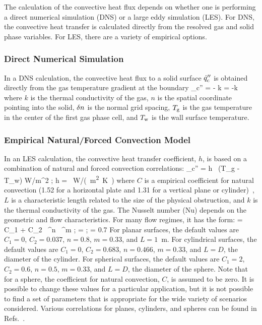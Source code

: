 The calculation of the convective heat flux depends on whether one is performing a direct numerical simulation (DNS) or a large eddy simulation (LES). For DNS, the convective heat transfer is calculated directly from the resolved gas and solid phase variables. For LES, there are a variety of empirical options.

\subsubsection{Direct Numerical Simulation}

In a DNS calculation, the convective heat flux to a solid surface $\dot{q}''_{\rm c}$ is obtained directly from the gas temperature gradient at the boundary
\be
   \dq_{\rm c}'' = - k \;  = -k 
\ee
where $k$ is the thermal conductivity of the gas, $n$ is the spatial coordinate pointing into the solid, $\delta n$ is the normal grid spacing, $T_{\rm g}$ is the gas temperature in the center of the first gas phase cell, and $T_{\rm w}$ is the wall surface temperature.

\subsubsection{Empirical Natural/Forced Convection Model}

In an LES calculation, the convective heat transfer coefficient, $h$, is based on a combination of natural and forced convection correlations:
\be \dq_{\rm c}'' = h \, (T_{\rm g} - T_{\rm w}) \quad \hbox{W/m}^2 \quad ; \quad h =
    \max \,   \quad  \si{W/(m^2.K)}
    \label{eq:qconv}
\ee
where $C$ is a empirical coefficient for natural convection (1.52 for a horizontal plate and 1.31 for a vertical plane or cylinder)~\cite{Holman:1}, $L$ is a characteristic length related to the size of the physical obstruction, and $k$ is the thermal conductivity of the gas. The Nusselt number (Nu) depends on the geometric and flow characteristics. For many flow regimes, it has the form:
\be
   \NU = C_1 + C_2 \, \RE^n \, \PR^m  \quad ; \quad \RE =  \quad ; \quad \PR = 0.7
\ee
For planar surfaces, the default values are $C_1=0$, $C_2=0.037$, $n=0.8$, $m=0.33$, and $L=1$~m. For cylindrical surfaces, the default values are $C_1=0$, $C_2=0.683$, $n=0.466$, $m=0.33$, and $L=D$, the diameter of the cylinder. For spherical surfaces, the default values are $C_1=2$, $C_2=0.6$, $n=0.5$, $m=0.33$, and $L=D$, the diameter of the sphere. Note that for a sphere, the coefficient for natural convection, $C$, is assumed to be zero. It is possible to change these values for a particular application, but it is not possible to find a set of parameters that is appropriate for the wide variety of scenarios considered. Various correlations for planes, cylinders, and spheres can be found in Refs.~\cite{Holman:1,Incropera:1}.


